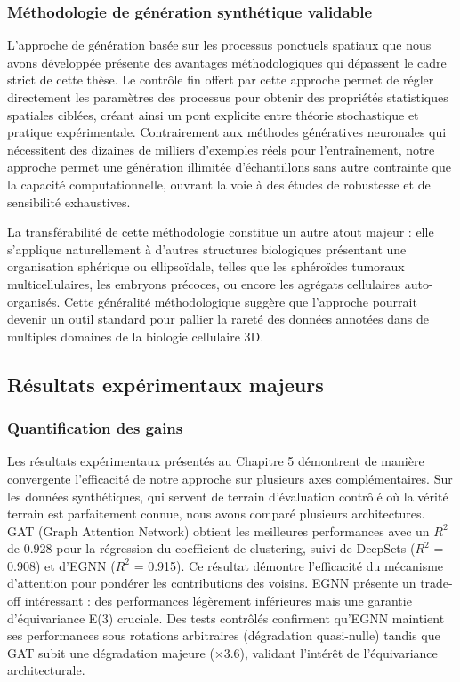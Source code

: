 \subsubsection{Méthodologie de génération synthétique validable}

L'approche de génération basée sur les processus ponctuels spatiaux que nous avons développée présente des avantages méthodologiques qui dépassent le cadre strict de cette thèse. Le contrôle fin offert par cette approche permet de régler directement les paramètres des processus pour obtenir des propriétés statistiques spatiales ciblées, créant ainsi un pont explicite entre théorie stochastique et pratique expérimentale. Contrairement aux méthodes génératives neuronales qui nécessitent des dizaines de milliers d'exemples réels pour l'entraînement, notre approche permet une génération illimitée d'échantillons sans autre contrainte que la capacité computationnelle, ouvrant la voie à des études de robustesse et de sensibilité exhaustives. 

La transférabilité de cette méthodologie constitue un autre atout majeur : elle s'applique naturellement à d'autres structures biologiques présentant une organisation sphérique ou ellipsoïdale, telles que les sphéroïdes tumoraux multicellulaires, les embryons précoces, ou encore les agrégats cellulaires auto-organisés. Cette généralité méthodologique suggère que l'approche pourrait devenir un outil standard pour pallier la rareté des données annotées dans de multiples domaines de la biologie cellulaire 3D.

\subsection{Résultats expérimentaux majeurs}

\subsubsection{Quantification des gains}

Les résultats expérimentaux présentés au Chapitre 5 démontrent de manière convergente l'efficacité de notre approche sur plusieurs axes complémentaires. Sur les données synthétiques, qui servent de terrain d'évaluation contrôlé où la vérité terrain est parfaitement connue, nous avons comparé plusieurs architectures. GAT (Graph Attention Network) obtient les meilleures performances avec un $R^2$ de 0.928 pour la régression du coefficient de clustering, suivi de DeepSets ($R^2$ = 0.908) et d'EGNN ($R^2$ = 0.915). Ce résultat démontre l'efficacité du mécanisme d'attention pour pondérer les contributions des voisins. EGNN présente un trade-off intéressant : des performances légèrement inférieures mais une garantie d'équivariance E(3) cruciale. Des tests contrôlés confirment qu'EGNN maintient ses performances sous rotations arbitraires (dégradation quasi-nulle) tandis que GAT subit une dégradation majeure (×3.6), validant l'intérêt de l'équivariance architecturale.

